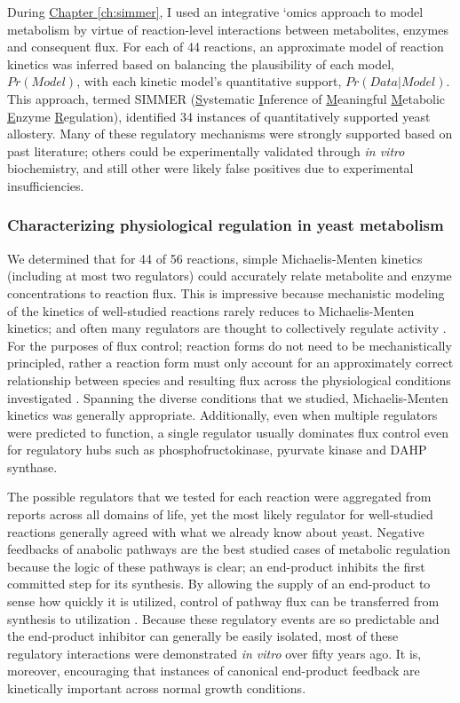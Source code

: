 During \hyperref[ch:simmer]{Chapter \ref{ch:simmer}}, I used an integrative `omics approach to model metabolism by virtue of reaction-level interactions between metabolites, enzymes and consequent flux. For each of 44 reactions, an approximate model of reaction kinetics was inferred based on balancing the plausibility of each model, $Pr(Model)$, with each kinetic model's quantitative support, $Pr(Data | Model)$. This approach, termed SIMMER (\underline{S}ystematic \underline{I}nference of \underline{M}eaningful \underline{M}etabolic \underline{E}nzyme \underline{R}egulation), identified 34 instances of quantitatively supported yeast allostery.  Many of these regulatory mechanisms were strongly supported based on past literature; others could be experimentally validated through \textit{in vitro} biochemistry, and still other were likely false positives due to experimental insufficiencies.

\subsubsection{Characterizing physiological regulation in yeast metabolism}

We determined that for 44 of 56 reactions, simple Michaelis-Menten kinetics (including at most two regulators) could accurately relate metabolite and enzyme concentrations to reaction flux. This is impressive because mechanistic modeling of the kinetics of well-studied reactions rarely reduces to Michaelis-Menten kinetics; and often many regulators are thought to collectively regulate activity \cite{Hill:1977vm}. For the purposes of flux control; reaction forms do not need to be mechanistically principled, rather a reaction form must only account for an approximately correct relationship between species and resulting flux across the physiological conditions investigated \cite{Fell:1997wg}. Spanning the diverse conditions that we studied, Michaelis-Menten kinetics was generally appropriate. Additionally, even when multiple regulators were predicted to function, a single regulator usually dominates flux control even for regulatory hubs such as phosphofructokinase, pyurvate kinase and DAHP synthase.  

The possible regulators that we tested for each reaction were aggregated from reports across all domains of life, yet the most likely regulator for well-studied reactions generally agreed with what we already know about yeast.  Negative feedbacks of anabolic pathways are the best studied cases of metabolic regulation because the logic of these pathways is clear; an end-product inhibits the first committed step for its synthesis.  By allowing the supply of an end-product to sense how quickly it is utilized, control of pathway flux can be transferred from synthesis to utilization \cite{CornishBowden:1995fy}. Because these regulatory events are so predictable and the end-product inhibitor can generally be easily isolated, most of these regulatory interactions were demonstrated \textit{in vitro} over fifty years ago. It is, moreover, encouraging that instances of canonical end-product feedback are kinetically important across normal growth conditions.

